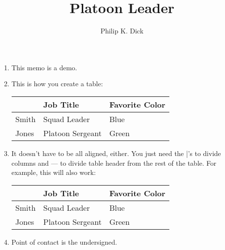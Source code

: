 \documentclass{./latex/armymemo-notikz}
\author{Philip K. Dick}\rank{1LT}\branch{EN}
\title{Platoon Leader}
\begin{document}
\begin{enumerate}
\item This memo is a demo.
\item This is how you create a table:


\begin{center}
\begin{tabular}{|l|l|l|}
\hline
       & Job Title          & Favorite Color    \\
\hline
 Smith & Squad Leader       & Blue              \\\hline
 Jones & Platoon Sergeant   & Green             \\
\hline
\end{tabular}
\end{center}
\item It doesn't have to be all aligned, either. You just need the |'s to divide columns and --- to divide table header from the rest of the table. For example, this will also work:


\begin{center}
\begin{tabular}{|l|l|l|}
\hline
       & Job Title          & Favorite Color    \\
\hline
 Smith & Squad Leader       & Blue              \\\hline
 Jones & Platoon Sergeant   & Green             \\
\hline
\end{tabular}
\end{center}
\item Point of contact is the undersigned.
\end{enumerate}
\end{document}
